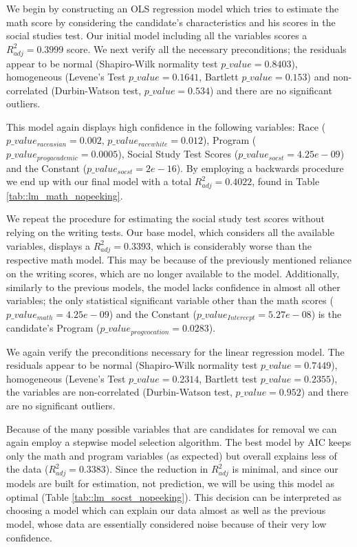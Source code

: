 \documentclass[10pt, a4paper]{article}
\begin{document}
	We begin by constructing an OLS regression model which tries to estimate the math score by considering the candidate's characteristics and his scores in the social studies test. Our initial model including all the variables scores a $R^2_{adj} = 0.3999$ score. We next verify all the necessary preconditions; the residuals appear to be normal (Shapiro-Wilk normality test $p\_value = 0.8403$), homogeneous (Levene's Test $p\_value = 0.1641$, Bartlett $p\_value = 0.153$) and non-correlated (Durbin-Watson test, $p\_value=0.534$) and there are no significant outliers. 
	
	This model again displays high confidence in the following variables: Race ($p\_value_{raceasian} = 0.002$, $p\_value_{racewhite} = 0.012$), Program ($p\_value_{progacademic} = 0.0005$), Social Study Test Scores ($p\_value_{socst} = 4.25e-09$) and the Constant ($p\_value_{socst} = 2e-16$). By employing a backwards procedure we end up with our final model with a total $R^2_{adj} = 0.4022$, found in Table \ref{tab::lm_math_nopeeking}.
	
	
	
	We repeat the procedure for estimating the social study test scores without relying on the writing tests. Our base model, which considers all the available variables, displays a $R^2_{adj} = 0.3393$, which is considerably worse than the respective math model. This may be because of the previously mentioned reliance on the writing scores, which are no longer available to the model. Additionally, similarly to the previous models, the model lacks confidence in almost all other variables; the only statistical significant variable other than the math scores ($p\_value_{math} = 4.25e-09$) and the Constant ($p\_value_{Intercept} = 5.27e-08$) is the candidate's Program ($p\_value_{progvocation} = 0.0283$).
	
	We again verify the preconditions necessary for the linear regression model. The residuals appear to be normal (Shapiro-Wilk normality test $p\_value = 0.7449$), homogeneous (Levene's Test $p\_value = 0.2314$, Bartlett test $p\_value = 0.2355$), the variables are non-correlated (Durbin-Watson test, $p\_value=0.952$) and there are no significant outliers.
	
	Because of the many possible variables that are candidates for removal we can again employ a stepwise model selection algorithm. The best model by AIC keeps only the math and program variables (as expected) but overall explains less of the data ($R^2_{adj} = 0.3383$). Since the reduction in $R^2_{adj}$ is minimal, and since our models are built for estimation, not prediction, we will be using this model as optimal (Table \ref{tab::lm_socst_nopeeking}). This decision can be interpreted as choosing a model which can explain our data almost as well as the previous model, whose data are essentially considered noise because of their very low confidence.
	
\end{document}
